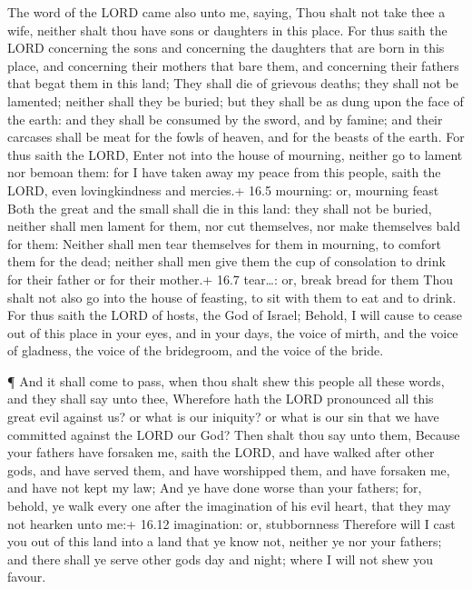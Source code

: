  The word of the LORD came also unto me, saying,
 Thou shalt not take thee a wife, neither shalt thou have
sons or daughters in this place.  For thus saith the LORD
concerning the sons and concerning the daughters that are born in this
place, and concerning their mothers that bare them, and concerning their
fathers that begat them in this land;  They shall die of
grievous deaths; they shall not be lamented; neither shall they be
buried; but they shall be as dung upon the face of the earth: and they
shall be consumed by the sword, and by famine; and their carcases shall
be meat for the fowls of heaven, and for the beasts of the earth.
 For thus saith the LORD, Enter not into the house of
mourning, neither go to lament nor bemoan them: for I have taken away my
peace from this people, saith the LORD, even lovingkindness and
mercies.+ 16.5 mourning: or, mourning feast  Both the great
and the small shall die in this land: they shall not be buried, neither
shall men lament for them, nor cut themselves, nor make themselves bald
for them:  Neither shall men tear themselves for them in
mourning, to comfort them for the dead; neither shall men give them the
cup of consolation to drink for their father or for their mother.+ 16.7
tear\ldots: or, break bread for them  Thou shalt not also go
into the house of feasting, to sit with them to eat and to drink.
 For thus saith the LORD of hosts, the God of Israel;
Behold, I will cause to cease out of this place in your eyes, and in
your days, the voice of mirth, and the voice of gladness, the voice of
the bridegroom, and the voice of the bride.

 ¶ And it shall come to pass, when thou shalt shew this
people all these words, and they shall say unto thee, Wherefore hath the
LORD pronounced all this great evil against us? or what is our iniquity?
or what is our sin that we have committed against the LORD our God?
 Then shalt thou say unto them, Because your fathers have
forsaken me, saith the LORD, and have walked after other gods, and have
served them, and have worshipped them, and have forsaken me, and have
not kept my law;  And ye have done worse than your fathers;
for, behold, ye walk every one after the imagination of his evil heart,
that they may not hearken unto me:+ 16.12 imagination: or, stubbornness
 Therefore will I cast you out of this land into a land
that ye know not, neither ye nor your fathers; and there shall ye serve
other gods day and night; where I will not shew you favour.

